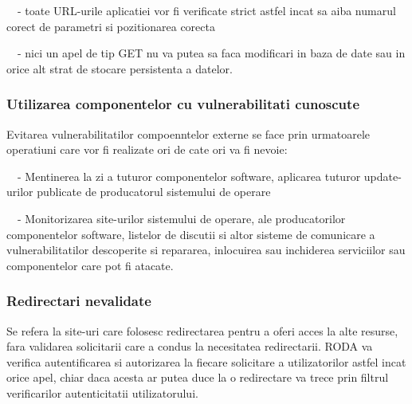 {\sffamily\color{black}
\ \ {}- toate URL-urile aplicatiei vor fi verificate strict astfel incat sa aiba
numarul corect de parametri si pozitionarea corecta}

{\sffamily\color{black}
\ \ {}- nici un apel de tip GET nu va putea sa faca modificari in baza de date sau in orice alt strat de stocare
persistenta a datelor. }


\bigskip

\subsubsection{Utilizarea componentelor cu vulnerabilitati cunoscute}

\bigskip

{\sffamily\color{black}
Evitarea vulnerabilitatilor compoenntelor externe se face prin urmatoarele operatiuni care vor fi realizate ori de cate
ori va fi nevoie:}

{\sffamily\color{black}
\ \ {}- Mentinerea la zi a tuturor componentelor software, aplicarea tuturor update-urilor publicate de producatorul
sistemului de operare}

{\sffamily\color{black}
\ \ {}- Monitorizarea site-urilor sistemului de operare, ale producatorilor componentelor software, listelor de discutii
si altor sisteme de comunicare a vulnerabilitatilor descoperite si repararea, inlocuirea sau inchiderea serviciilor sau
componentelor care pot fi atacate. }


\bigskip

\subsubsection{Redirectari nevalidate }

\bigskip

{\sffamily\color{black}
Se refera la site-uri care folosesc redirectarea pentru a oferi acces la alte resurse, fara validarea solicitarii care a
condus la necesitatea redirectarii. RODA va verifica autentificarea si autorizarea la fiecare solicitare a
utilizatorilor astfel incat orice apel, chiar daca acesta ar putea duce la o redirectare va trece prin filtrul
verificarilor autenticitatii utilizatorului. }
